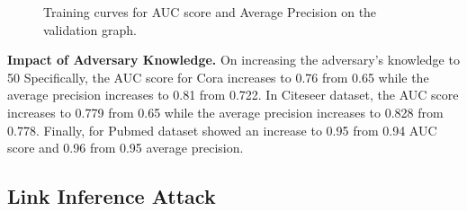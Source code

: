 \begin{figure}[!htb]
    \centering
    \begin{minipage}[b]{1\linewidth}
    \centering
    \end{minipage}
    \caption{Training curves for AUC score and Average Precision on the validation graph.}
    \label{fig:valgraphrecon}
\end{figure}

\noindent\textbf{Impact of Adversary Knowledge.} On increasing the adversary's knowledge to 50%
Specifically, the AUC score for Cora increases to 0.76 from 0.65 while the average precision increases to 0.81 from 0.722.
In Citeseer dataset, the AUC score increases to 0.779 from 0.65 while the average precision increases to 0.828 from 0.778.
Finally, for Pubmed dataset showed an increase to 0.95 from 0.94 AUC score and 0.96 from 0.95 average precision.



\subsection{Link Inference Attack}

